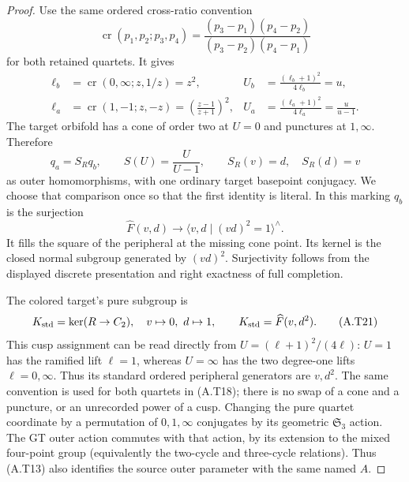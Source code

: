 \begin{proof}
Use the same ordered cross-ratio convention
\[
 \operatorname{cr}(p_1,p_2;p_3,p_4)
 =\frac{(p_3-p_1)(p_4-p_2)}{(p_3-p_2)(p_4-p_1)}
\]
for both retained quartets.  It gives
\[
\begin{aligned}
 \ell_b&=\operatorname{cr}(0,\infty;z,1/z)=z^2,
 &U_b&=\frac{(\ell_b+1)^2}{4\ell_b}=u,\\
 \ell_a&=\operatorname{cr}(1,-1;z,-z)
                  =\left(\frac{z-1}{z+1}\right)^2,
 &U_a&=\frac{(\ell_a+1)^2}{4\ell_a}=\frac{u}{u-1}.
\end{aligned}                                                \tag{A.T18}
\]
The target orbifold has a cone of order two at $U=0$
and punctures at $1,\infty$.  Therefore
\[
 q_a=S_Rq_b,\qquad S(U)=\frac U{U-1},\qquad
 S_R(v)=d,\quad S_R(d)=v                              \tag{A.T19}
\]
as outer homomorphisms, with one ordinary target basepoint
conjugacy.  We choose that comparison once so that the first
identity is literal.  In this marking $q_b$ is the surjection
\[
 \widehat F(v,d)\longrightarrow
       \langle v,d\mid(vd)^2=1\rangle^{\wedge}.             \tag{A.T20}
\]
It fills the square of the peripheral at the missing cone
point.  Its kernel is the closed normal subgroup generated
by $(vd)^2$.  Surjectivity follows from the displayed discrete
presentation and right exactness of full completion.

The colored target's pure subgroup is
\[
 K_{\rm std}=\ker(R\to C_2),\quad v\mapsto0,
 \ d\mapsto1,\qquad K_{\rm std}=\widehat F(v,d^2).        \tag{A.T21}
\]
This cusp assignment can be read directly from
$U=(\ell+1)^2/(4\ell)$: $U=1$ has the ramified lift
$\ell=1$, whereas $U=\infty$ has the two degree-one
lifts $\ell=0,\infty$.  Thus its standard ordered
peripheral generators are $v,d^2$.  The same convention
is used for both quartets in (A.T18); there is no swap of
a cone and a puncture, or an unrecorded power of a cusp.
Changing the pure quartet coordinate by a permutation of
$0,1,\infty$ conjugates by its geometric
$\mathfrak S_3$ action.  The GT outer action commutes with
that action, by its extension to the mixed four-point
group (equivalently the two-cycle and three-cycle
relations).  Thus (A.T13) also identifies the source
outer parameter with the same named $A$.


\end{proof}
